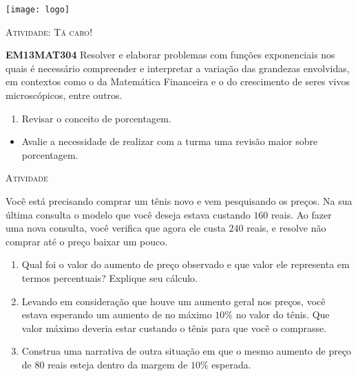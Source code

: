\documentclass[10 pt,usenames,dvipsnames, oneside]{article}
\begin{document}
\begin{center}
  \begin{minipage}[l]{3cm}
\texttt{[image: logo]}    
\end{minipage}\hfill
\begin{minipage}[r]{.8\textwidth}
 {\Large \scshape Atividade: Tá caro!}  
\end{minipage}
\end{center}
\vspace{.2cm}

\ifdefined\prof
\begin{objetivos}
\item \textbf{EM13MAT304} Resolver e elaborar problemas com funções exponenciais nos quais é necessário compreender e interpretar a variação das grandezas envolvidas, em contextos como o da Matemática Financeira e o do crescimento de seres vivos microscópicos, entre outros. 
\end{objetivos}

\begin{goals}
\begin{enumerate}
	\item Revisar o conceito de porcentagem.
\end{enumerate}

\tcblower

\begin{itemize}
	\item Avalie a necessidade de realizar com a turma uma revisão maior sobre porcentagem.
\end{itemize}
\end{goals}

\bigskip
\begin{center}
{\large \scshape Atividade}
\end{center}
\fi

Você está precisando comprar um tênis novo e vem pesquisando os preços. Na sua última consulta o modelo que você deseja estava custando $160$ reais. Ao fazer uma nova consulta, você verifica que agora ele custa $240$ reais, e resolve não comprar até o preço baixar um pouco.

\begin{enumerate}

\item{}
Qual foi o valor do aumento de preço observado e que valor ele representa em termos percentuais? Explique seu cálculo.

\item{}
Levando em consideração que houve um aumento geral nos preços, você estava esperando um aumento de no máximo $10\%$ no valor do tênis. Que valor máximo deveria estar custando o tênis para que você o comprasse.

\item{}
Construa uma narrativa de outra situação em que o mesmo aumento de preço de $80$ reais esteja dentro da margem de $10\%$ esperada.

\end{enumerate}
\end{document}

